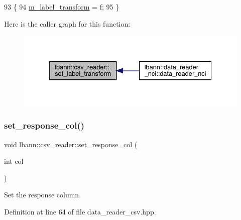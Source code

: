 \begin{DoxyCode}
93                                                                  \{
94     \hyperlink{classlbann_1_1csv__reader_aa9b671a172828980cb9c91180c3d0ad8}{m\_label\_transform} = f;
95   \}
\end{DoxyCode}
Here is the caller graph for this function\+:\nopagebreak
\begin{figure}[H]
\begin{center}
\leavevmode
\includegraphics[width=332pt]{classlbann_1_1csv__reader_afa41685e0d81ab1b2b8e8739c94873cc_icgraph}
\end{center}
\end{figure}
\mbox{\label{classlbann_1_1csv__reader_aed2d76ec0f0a338047a4d15fc43413fb}} 
\subsubsection{\texorpdfstring{set\+\_\+response\+\_\+col()}{set\_response\_col()}}
{\footnotesize\ttfamily void lbann\+::csv\+\_\+reader\+::set\+\_\+response\+\_\+col (\begin{DoxyParamCaption}\item[{int}]{col }\end{DoxyParamCaption})\hspace{0.3cm}{\ttfamily [inline]}}



Set the response column. 



Definition at line 64 of file data\+\_\+reader\+\_\+csv.\+hpp.


